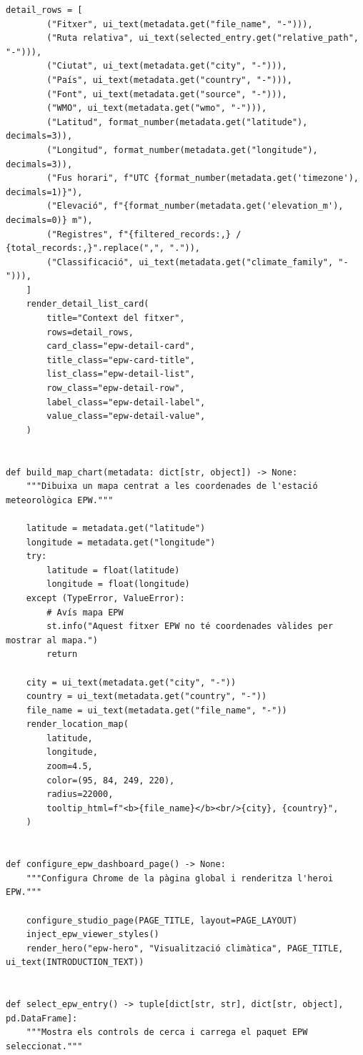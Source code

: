 \documentclass[10pt,a4paper]{article}
\begin{document}
\begin{lstlisting}[style=studioPython,caption={pages/Visor\_Climes\_EPW.py},label={lst:pages-visor-climes-epw-py}]
    detail_rows = [
        ("Fitxer", ui_text(metadata.get("file_name", "-"))),
        ("Ruta relativa", ui_text(selected_entry.get("relative_path", "-"))),
        ("Ciutat", ui_text(metadata.get("city", "-"))),
        ("País", ui_text(metadata.get("country", "-"))),
        ("Font", ui_text(metadata.get("source", "-"))),
        ("WMO", ui_text(metadata.get("wmo", "-"))),
        ("Latitud", format_number(metadata.get("latitude"), decimals=3)),
        ("Longitud", format_number(metadata.get("longitude"), decimals=3)),
        ("Fus horari", f"UTC {format_number(metadata.get('timezone'), decimals=1)}"),
        ("Elevació", f"{format_number(metadata.get('elevation_m'), decimals=0)} m"),
        ("Registres", f"{filtered_records:,} / {total_records:,}".replace(",", ".")),
        ("Classificació", ui_text(metadata.get("climate_family", "-"))),
    ]
    render_detail_list_card(
        title="Context del fitxer",
        rows=detail_rows,
        card_class="epw-detail-card",
        title_class="epw-card-title",
        list_class="epw-detail-list",
        row_class="epw-detail-row",
        label_class="epw-detail-label",
        value_class="epw-detail-value",
    )


def build_map_chart(metadata: dict[str, object]) -> None:
    """Dibuixa un mapa centrat a les coordenades de l'estació meteorològica EPW."""

    latitude = metadata.get("latitude")
    longitude = metadata.get("longitude")
    try:
        latitude = float(latitude)
        longitude = float(longitude)
    except (TypeError, ValueError):
        # Avís mapa EPW
        st.info("Aquest fitxer EPW no té coordenades vàlides per mostrar al mapa.")
        return

    city = ui_text(metadata.get("city", "-"))
    country = ui_text(metadata.get("country", "-"))
    file_name = ui_text(metadata.get("file_name", "-"))
    render_location_map(
        latitude,
        longitude,
        zoom=4.5,
        color=(95, 84, 249, 220),
        radius=22000,
        tooltip_html=f"<b>{file_name}</b><br/>{city}, {country}",
    )


def configure_epw_dashboard_page() -> None:
    """Configura Chrome de la pàgina global i renderitza l'heroi EPW."""

    configure_studio_page(PAGE_TITLE, layout=PAGE_LAYOUT)
    inject_epw_viewer_styles()
    render_hero("epw-hero", "Visualització climàtica", PAGE_TITLE, ui_text(INTRODUCTION_TEXT))


def select_epw_entry() -> tuple[dict[str, str], dict[str, object], pd.DataFrame]:
    """Mostra els controls de cerca i carrega el paquet EPW seleccionat."""


\end{lstlisting}
\end{document}
